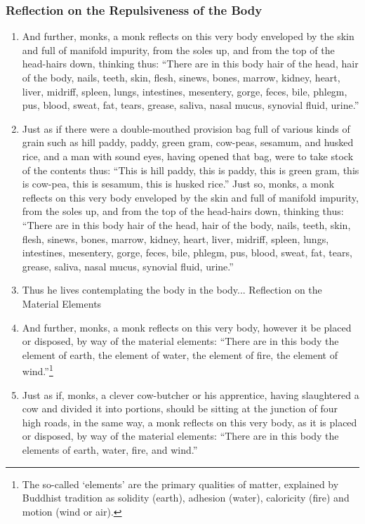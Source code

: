 \documentclass[a4 paper, 12pt]{article}
\begin{document}
\begin{multicols}{2}
\subsubsection*{Reflection on the Repulsiveness of the Body}
\begin{enumerate}[resume]
\item And further, monks, a monk reflects on this very body enveloped by the skin and full of manifold impurity, from the soles up, and from the top of the head-hairs down, thinking thus: “There are in this body hair of the head, hair of the body, nails, teeth, skin, flesh, sinews, bones, marrow, kidney, heart, liver, midriff, spleen, lungs, intestines, mesentery, gorge, feces, bile, phlegm, pus, blood, sweat, fat, tears, grease, saliva, nasal mucus, synovial fluid, urine.”
\item Just as if there were a double-mouthed provision bag full of various kinds of grain such as hill paddy, paddy, green gram, cow-peas, sesamum, and husked rice, and a man with sound eyes, having opened that bag, were to take stock of the contents thus: “This is hill paddy, this is paddy, this is green gram, this is cow-pea, this is sesamum, this is husked rice.” Just so, monks, a monk reflects on this very body enveloped by the skin and full of manifold impurity, from the soles up, and from the top of the head-hairs down, thinking thus: “There are in this body hair of the head, hair of the body, nails, teeth, skin, flesh, sinews, bones, marrow, kidney, heart, liver, midriff, spleen, lungs, intestines, mesentery, gorge, feces, bile, phlegm, pus, blood, sweat, fat, tears, grease, saliva, nasal mucus, synovial fluid, urine.”
\item Thus he lives contemplating the body in the body...
Reflection on the Material Elements
\item And further, monks, a monk reflects on this very body, however it be placed or disposed, by way of the material elements: “There are in this body the element of earth, the element of water, the element of fire, the element of wind.”\footnote{The so-called ‘elements’ are the primary qualities of matter, explained by Buddhist tradition as solidity (earth), adhesion (water), caloricity (fire) and motion (wind or air).}
\item Just as if, monks, a clever cow-butcher or his apprentice, having slaughtered a cow and divided it into portions, should be sitting at the junction of four high roads, in the same way, a monk reflects on this very body, as it is placed or disposed, by way of the material elements: “There are in this body the elements of earth, water, fire, and wind.”

\end{enumerate}
\end{multicols}
\end{document}
